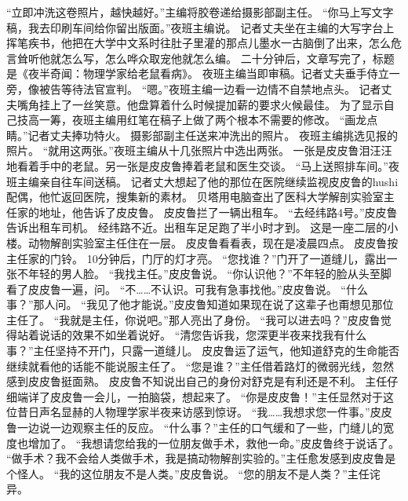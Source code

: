 \documentclass[a4paper,12pt,UTF8,twoside]{ctexbook}
\begin{document}
        “立即冲洗这卷照片，越快越好。”主编将胶卷递给摄影部副主任。 
        “你马上写文字稿，我去印刷车间给你留出版面。”夜班主编说。 
        记者丈夫坐在主编的大写字台上挥笔疾书，他把在大学中文系时往肚子里灌的那点儿墨水一古脑倒了出来，怎么危言耸听他就怎么写，怎么哗众取宠他就怎么编。 
        二十分钟后，文章写完了，标题是《夜半奇闻：物理学家给老鼠看病》。 
        夜班主编当即审稿。记者丈夫垂手侍立一旁，像被告等待法官宣判。 
        “嗯。”夜班主编一边看一边情不自禁地点头。 
        记者丈夫嘴角挂上了一丝笑意。他盘算着什么时候提加薪的要求火候最佳。 
        为了显示自己技高一筹，夜班主编用红笔在稿子上做了两个根本不需要的修改。 
        “画龙点睛。”记者丈夫捧功特火。 
        摄影部副主任送来冲洗出的照片。 
        夜班主编挑选见报的照片。 
        “就用这两张。”夜班主编从十几张照片中选出两张。 
        一张是皮皮鲁泪汪汪地看着手中的老鼠。另一张是皮皮鲁捧着老鼠和医生交谈。 
        “马上送照排车间。”夜班主编亲自往车间送稿。 
        记者丈大想起了他的那位在医院继续监视皮皮鲁的hushi配偶，他忙返回医院，搜集新的素材。 
        贝塔用电脑查出了医科大学解剖实验室主任家的地址，他告诉了皮皮鲁。 
        皮皮鲁拦了一辆出租车。 
        “去经纬路4号。”皮皮鲁告诉出租车司机。 
        经纬路不近。出租车足足跑了半小时才到。 
        这是一座二层的小楼。动物解剖实验室主任住在一层。 
        皮皮鲁看看表，现在是凌晨四点。 
        皮皮鲁按主任家的门铃。 
        10分钟后，门厅的灯才亮。 
        “您找谁？”门开了一道缝儿，露出一张不年轻的男人脸。 
        “我找主任。”皮皮鲁说。 
        “你认识他？”不年轻的脸从头至脚看了皮皮鲁一遍，问。 
        “不……不认识。可我有急事找他。”皮皮鲁说。 
        “什么事？”那人问。 
        “我见了他才能说。”皮皮鲁知道如果现在说了这辈子也甭想见那位主任了。 
        “我就是主任，你说吧。”那人亮出了身份。 
        “我可以进去吗？”皮皮鲁觉得站着说话的效果不如坐着说好。 
        “清您告诉我，您深更半夜来找我有什么事？”主任坚持不开门，只露一道缝儿。 
        皮皮鲁运了运气，他知道舒克的生命能否继续就看他的话能不能说服主任了。 
        “您是谁？”主任借着路灯的微弱光线，忽然感到皮皮鲁挺面熟。 
        皮皮鲁不知说出自己的身份对舒克是有利还是不利。 
        主任仔细端详了皮皮鲁一会儿，一拍脑袋，想起来了。 
        “你是皮皮鲁！”主任显然对于这位昔日声名显赫的人物理学家半夜来访感到惊讶。 
        “我……我想求您一件事。”皮皮鲁一边说一边观察主任的反应。 
        “什么事？”主任的口气缓和了一些，门缝儿的宽度也增加了。 
        “我想请您给我的一位朋友做手术，救他一命。”皮皮鲁终于说话了。 
        “做手术？我不会给人类做手术，我是搞动物解剖实验的。”主任愈发感到皮皮鲁是个怪人。 
        “我的这位朋友不是人类。”皮皮鲁说。 
        “您的朋友不是人类？”主任诧异。 
\end{document}
